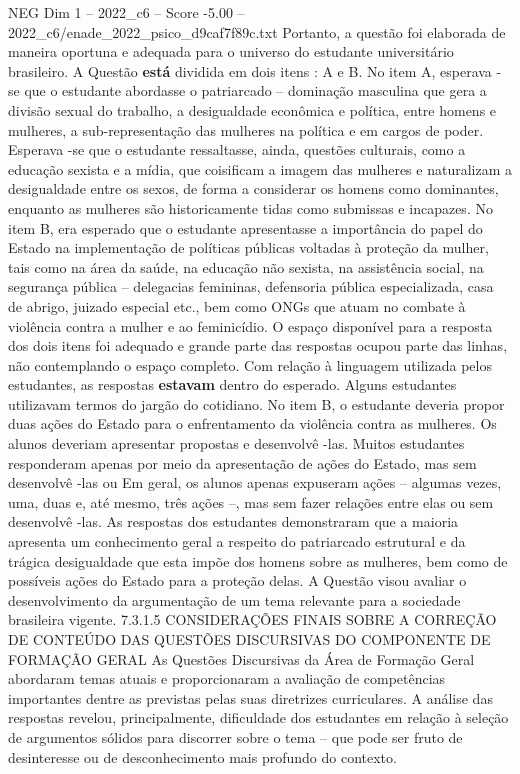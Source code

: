 \begin{textsample}{NEG Dim 1 – 2022\_c6 – Score -5.00 – 2022\_c6/enade\_2022\_psico\_d9caf7f89c.txt}
Portanto, a questão foi elaborada de maneira oportuna e adequada para o universo do estudante universitário brasileiro.
A Questão \textbf{está} dividida em dois itens : A e B.
No item A, esperava -se que o estudante abordasse o patriarcado – dominação masculina que gera a divisão sexual do trabalho, a desigualdade econômica e política, entre homens e mulheres, a sub-representação das mulheres na política e em cargos de poder.
Esperava -se que o estudante ressaltasse, ainda, questões culturais, como a educação sexista e a mídia, que coisificam a imagem das mulheres e naturalizam a desigualdade entre os sexos, de forma a considerar os homens como dominantes, enquanto as mulheres são historicamente tidas como submissas e incapazes.
No item B, era esperado que o estudante apresentasse a importância do papel do Estado na implementação de políticas públicas voltadas à proteção da mulher, tais como na área da saúde, na educação não sexista, na assistência social, na segurança pública – delegacias femininas, defensoria pública especializada, casa de abrigo, juizado especial etc., bem como ONGs que atuam no combate à violência contra a mulher e ao feminicídio.
O espaço disponível para a resposta dos dois itens foi adequado e grande parte das respostas ocupou parte das linhas, não contemplando o espaço completo.
Com relação à linguagem utilizada pelos estudantes, as respostas \textbf{estavam} dentro do esperado.
Alguns estudantes utilizavam termos do jargão do cotidiano.
No item B, o estudante deveria propor duas ações do Estado para o enfrentamento da violência contra as mulheres.
Os alunos deveriam apresentar propostas e desenvolvê -las.
Muitos estudantes responderam apenas por meio da apresentação de ações do Estado, mas sem desenvolvê -las ou Em geral, os alunos apenas expuseram ações – algumas vezes, uma, duas e, até mesmo, três ações –, mas sem fazer relações entre elas ou sem desenvolvê -las.
As respostas dos estudantes demonstraram que a maioria apresenta um conhecimento geral a respeito do patriarcado estrutural e da trágica desigualdade que esta impõe dos homens sobre as mulheres, bem como de possíveis ações do Estado para a proteção delas.
A Questão visou avaliar o desenvolvimento da argumentação de um tema relevante para a sociedade brasileira vigente. 7.3.1.5 CONSIDERAÇÕES FINAIS SOBRE A CORREÇÃO DE CONTEÚDO DAS QUESTÕES DISCURSIVAS DO COMPONENTE DE FORMAÇÃO GERAL As Questões Discursivas da Área de Formação Geral abordaram temas atuais e proporcionaram a avaliação de competências importantes dentre as previstas pelas suas diretrizes curriculares.
A análise das respostas revelou, principalmente, dificuldade dos estudantes em relação à seleção de argumentos sólidos para discorrer sobre o tema – que pode ser fruto de desinteresse ou de desconhecimento mais profundo do contexto.

\end{textsample}

